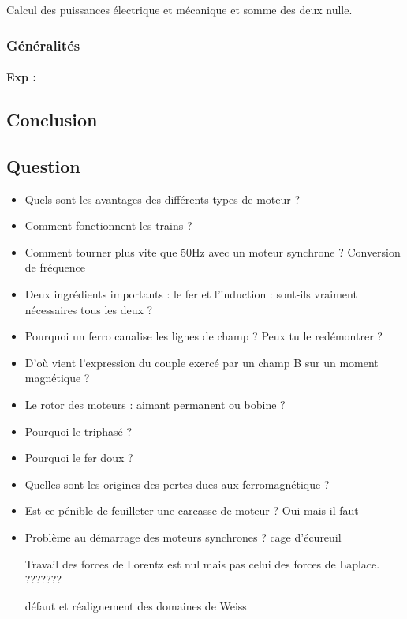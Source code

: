 Calcul des puissances électrique et mécanique et somme des deux nulle.

\subsubsection{Généralités}

\paragraph{Exp :}

\subsection{Conclusion}

\subsection{Question}

\begin{itemize}
\item Quels sont les avantages des différents types de moteur ?
\item Comment fonctionnent les trains ?
\item Comment tourner plus vite que 50Hz avec un moteur synchrone ? Conversion de fréquence
\item Deux ingrédients importants : le fer et l'induction : sont-ils vraiment nécessaires tous les deux ?
\item Pourquoi un ferro canalise les lignes de champ ? Peux tu le redémontrer ?
\item D'où vient l'expression du couple exercé par un champ B sur un moment magnétique ?
\item Le rotor des moteurs : aimant permanent ou bobine ?
\item Pourquoi le triphasé ?
\item Pourquoi le fer doux ?
\item Quelles sont les origines des pertes dues aux ferromagnétique ?
\item Est ce pénible de feuilleter une carcasse de moteur ? Oui mais il faut
\item Problème au démarrage des moteurs synchrones ? cage d'écureuil


Travail des forces de Lorentz est nul mais pas celui des forces de Laplace. ??????? 



défaut et réalignement des domaines de Weiss
\end{itemize}